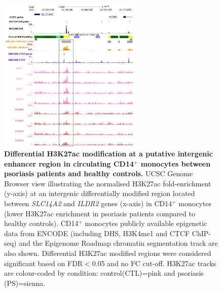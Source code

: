 \begin{figure}[htbp]
\centering
\includegraphics[width=0.6\textwidth]{./Results2/pdfs/ChIPm_H3K27ac_UCSC_CD14_ILDR1_track}
\caption[Differential H3K27ac modification at a putative intergenic enhancer region in circulating CD14$^+$ monocytes between psoriasis patients and healthy controls.]{\textbf{Differential H3K27ac modification at a putative intergenic enhancer region in circulating CD14$^+$ monocytes between psoriasis patients and healthy controls.} UCSC Genome Browser view illustrating the normalised H3K27ac fold-enrichment (y-axis) at an intergenic differentially modified region located between \textit{SLC14A2} and \textit{ILDR2} genes (x-axis) in CD14$^+$ monocytes (lower H3K27ac enrichment in psoriasis patients compared to healthy controls). CD14$^+$ monocytes publicly available epigenetic data from ENCODE (including DHS, H3K4me1 and CTCF ChIP-seq) and the Epigenome Roadmap chromatin segmentation track are also shown. Differential H3K27ac modified regions were considered significant based on FDR$<$0.05 and no FC cut-off. H3K27ac tracks are colour-coded by condition: control(CTL)=pink and psoriasis (PS)=sienna.}
\label{figure:ChIPm_H3K27ac_UCSC_ILDR1_track}
\end{figure}



